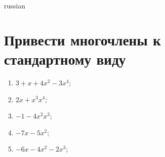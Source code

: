 \documentclass[a4paper]{article}
\begin{document}
\begin{otherlanguage*}{russian}

\section{Привести многочлены к стандартному виду}
\begin{enumerate}
\item $3 + x + 4x^2-3x^4$;
\item $2x + x^3x^4$;
\item $-1-4x^2x^3$;
\item $-7x-5x^2$;
\item $-6x-4x^2-2x^3$;
\end{enumerate}
\end{otherlanguage*}
\end{document}
